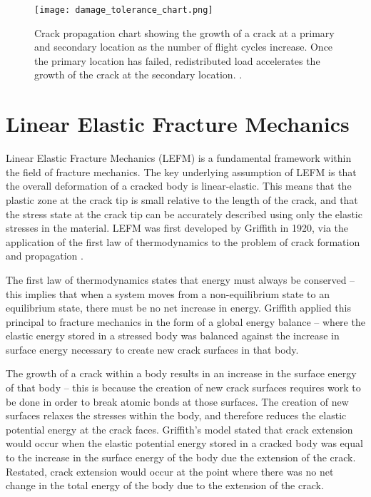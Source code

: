 \begin{figure}[H]
    \centering
    \texttt{[image: damage\_tolerance\_chart.png]}
    \caption{Crack propagation chart showing the growth of a crack at a primary and secondary location as the number of flight cycles increase. Once the primary location has failed, redistributed load accelerates the growth of the crack at the secondary location. \cite{tomblin_review_1999}.}
    \label{fig:damage_tolerance_chart}
\end{figure}

\newpage
\section{Linear Elastic Fracture Mechanics}\label{sec:lefm}

Linear Elastic Fracture Mechanics (LEFM) is a fundamental framework within the field of fracture mechanics. The key underlying assumption of LEFM is that the overall deformation of a cracked body is linear-elastic. This means that the plastic zone at the crack tip is small relative to the length of the crack, and that the stress state at the crack tip can be accurately described using only the elastic stresses in the material. LEFM was first developed by Griffith in 1920, via the application of the first law of thermodynamics to the problem of crack formation and propagation \cite{griffith_vi_1921}.

The first law of thermodynamics states that energy must always be conserved -- this implies that when a system moves from a non-equilibrium state to an equilibrium state, there must be no net increase in energy. Griffith applied this principal to fracture mechanics in the form of a global energy balance -- where the elastic energy stored in a stressed body was balanced against the increase in surface energy necessary to create new crack surfaces in that body.

The growth of a crack within a body results in an increase in the surface energy of that body -- this is because the creation of new crack surfaces requires work to be done in order to break atomic bonds at those surfaces. The creation of new surfaces relaxes the stresses within the body, and therefore reduces the elastic potential energy at the crack faces. Griffith's model stated that crack extension would occur when the elastic potential energy stored in a cracked body was equal to the increase in the surface energy of the body due the extension of the crack. Restated, crack extension would occur at the point where there was no net change in the total energy of the body due to the extension of the crack.

